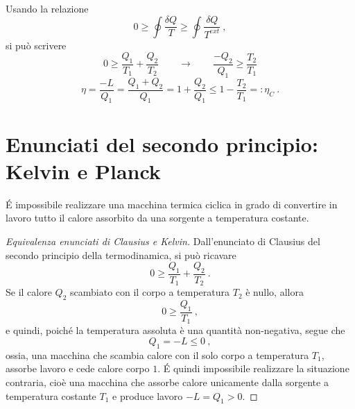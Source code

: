 \noindent
Usando la relazione
\begin{equation}
    0 \ge \oint \dfrac{\delta Q}{T} \ge \oint \dfrac{\delta Q}{T^{ext}} \ ,
\end{equation}
si può scrivere
\begin{equation}
    0 \ge \dfrac{Q_1}{T_1} + \dfrac{Q_2}{T_2} \qquad \rightarrow \qquad \dfrac{-Q_2}{Q_1} \ge \dfrac{T_2}{T_1}
\end{equation}
\begin{equation}
    \eta = \dfrac{-L}{Q_1} = \dfrac{Q_1 + Q_2}{Q_1} = 1 + \dfrac{Q_2}{Q_1} \le 1 - \dfrac{T_2}{T_1} =: \eta_C \ .
\end{equation}

\section{Enunciati del secondo principio: Kelvin e Planck}

\begin{definition} \'E impossibile realizzare una macchina termica ciclica in grado di convertire in lavoro tutto il calore assorbito da una sorgente a temperatura costante.
\end{definition}
\begin{proof}[Equivalenza enunciati di Clausius e Kelvin] Dall'enunciato di Clausius del secondo principio della termodinamica, si può ricavare
\begin{equation}
    0 \ge \dfrac{Q_1}{T_1} + \dfrac{Q_2}{T_2} \ .
\end{equation}
Se il calore $Q_2$ scambiato con il corpo a temperatura $T_2$ è nullo, allora
\begin{equation}
     0 \ge \dfrac{Q_1}{T_1} \ ,
\end{equation}
e quindi, poiché la temperatura assoluta è una quantità non-negativa, segue che
\begin{equation}
    Q_1 = -L \le 0 \ ,
\end{equation}
ossia, una macchina che scambia calore con il solo corpo a temperatura $T_1$, assorbe lavoro e cede calore corpo $1$. \'E quindi impossibile realizzare la situazione contraria, cioè una macchina che assorbe calore unicamente dalla sorgente a temperatura costante $T_1$ e produce lavoro $-L = Q_1 > 0$.
\end{proof}


